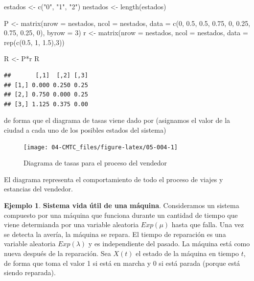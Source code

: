 \documentclass[
]{book}
\newenvironment{Shaded}{\begin{snugshade}}{\end{snugshade}}
\newcommand{\AttributeTok}[1]{\textcolor[rgb]{0.77,0.63,0.00}{#1}}
\newcommand{\DecValTok}[1]{\textcolor[rgb]{0.00,0.00,0.81}{#1}}
\newcommand{\FloatTok}[1]{\textcolor[rgb]{0.00,0.00,0.81}{#1}}
\newcommand{\FunctionTok}[1]{\textcolor[rgb]{0.00,0.00,0.00}{#1}}
\newcommand{\NormalTok}[1]{#1}
\newcommand{\OtherTok}[1]{\textcolor[rgb]{0.56,0.35,0.01}{#1}}
\newcommand{\SpecialCharTok}[1]{\textcolor[rgb]{0.00,0.00,0.00}{#1}}
\newcommand{\StringTok}[1]{\textcolor[rgb]{0.31,0.60,0.02}{#1}}
\theoremstyle{definition}
\theoremstyle{definition}
\newtheorem{example}{Ejemplo}[chapter]
\theoremstyle{definition}
\theoremstyle{definition}
\theoremstyle{remark}
\begin{document}
\begin{Shaded}
\begin{Highlighting}[]
\NormalTok{estados }\OtherTok{\textless{}{-}} \FunctionTok{c}\NormalTok{(}\StringTok{"0"}\NormalTok{, }\StringTok{"1"}\NormalTok{, }\StringTok{"2"}\NormalTok{)}
\NormalTok{nestados }\OtherTok{\textless{}{-}} \FunctionTok{length}\NormalTok{(estados)}

\NormalTok{P }\OtherTok{\textless{}{-}} \FunctionTok{matrix}\NormalTok{(}\AttributeTok{nrow =}\NormalTok{ nestados, }\AttributeTok{ncol =}\NormalTok{ nestados, }
            \AttributeTok{data =} \FunctionTok{c}\NormalTok{(}\DecValTok{0}\NormalTok{, }\FloatTok{0.5}\NormalTok{, }\FloatTok{0.5}\NormalTok{, }\FloatTok{0.75}\NormalTok{, }\DecValTok{0}\NormalTok{, }\FloatTok{0.25}\NormalTok{, }\FloatTok{0.75}\NormalTok{, }\FloatTok{0.25}\NormalTok{, }\DecValTok{0}\NormalTok{), }
            \AttributeTok{byrow =} \DecValTok{3}\NormalTok{)}
\NormalTok{r }\OtherTok{\textless{}{-}} \FunctionTok{matrix}\NormalTok{(}\AttributeTok{nrow =}\NormalTok{ nestados, }\AttributeTok{ncol =}\NormalTok{ nestados, }
            \AttributeTok{data =} \FunctionTok{rep}\NormalTok{(}\FunctionTok{c}\NormalTok{(}\FloatTok{0.5}\NormalTok{, }\DecValTok{1}\NormalTok{, }\FloatTok{1.5}\NormalTok{),}\DecValTok{3}\NormalTok{))}

\NormalTok{R }\OtherTok{\textless{}{-}}\NormalTok{ P}\SpecialCharTok{*}\NormalTok{r}
\NormalTok{R}
\end{Highlighting}
\end{Shaded}

\begin{verbatim}
##       [,1]  [,2] [,3]
## [1,] 0.000 0.250 0.25
## [2,] 0.750 0.000 0.25
## [3,] 1.125 0.375 0.00
\end{verbatim}

de forma que el diagrama de tasas viene dado por (asignamos el valor de la ciudad a cada uno de los posibles estados del sistema)

\begin{figure}

{\centering \texttt{[image: 04-CMTC\_files/figure-latex/05-004-1]} 

}

\caption{Diagrama de tasas para el proceso del vendedor}\label{fig:05-004}
\end{figure}

El diagrama representa el comportamiento de todo el proceso de viajes y estancias del vendedor.

\begin{example}
\protect\hypertarget{exm:excmtc005}{}\label{exm:excmtc005}\textbf{Sistema vida útil de una máquina}. Consideramos un sistema compuesto por una máquina que funciona durante un cantidad de tiempo que viene determianda por una variable aleatoria \(Exp(\mu)\) hasta que falla. Una vez se detecta la avería, la máquina se repara. El tiempo de reparación es una variable aleatoria \(Exp(\lambda)\) y es independiente del pasado. La máquina está como nueva después de la reparación. Sea \(X(t)\) el estado de la máquina en tiempo \(t\), de forma que toma el valor 1 si está en marcha y 0 si está parada (porque está siendo reparada).
\end{example}
\end{document}
